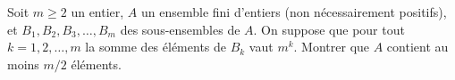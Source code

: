 Soit $m \geqslant 2$ un entier, $A$ un ensemble fini d'entiers (non nécessairement positifs), et
$B_1, B_2, B_3, \ldots, B_m$ des sous-ensembles de $A$. On suppose que pour tout $k = 1, 2, \ldots, m$ la somme
des éléments de $B_k$ vaut $m^k$. Montrer que $A$ contient au moins $m/2$ éléments.
